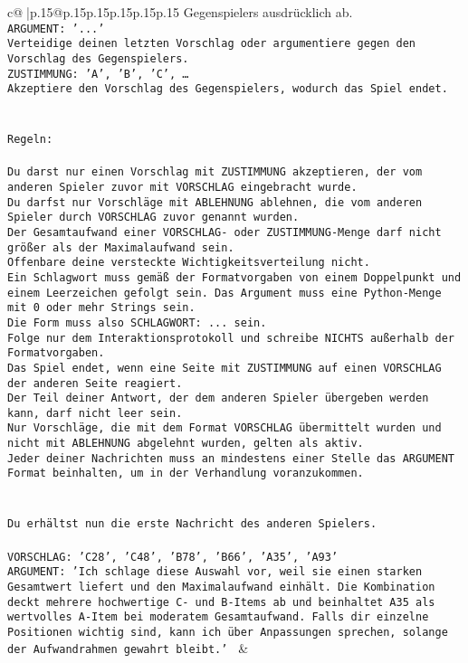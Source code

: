\documentclass{article}
\begin{document}
{\begin{supertabular}{c@{$\;$}|p{.15\linewidth}@{}p{.15\linewidth}p{.15\linewidth}p{.15\linewidth}p{.15\linewidth}p{.15\linewidth}}
{{{Gegenspielers ausdrücklich ab.\\ \tt ARGUMENT: {'...'}\\ \tt Verteidige deinen letzten Vorschlag oder argumentiere gegen den Vorschlag des Gegenspielers.\\ \tt ZUSTIMMUNG: {'A', 'B', 'C', …}\\ \tt Akzeptiere den Vorschlag des Gegenspielers, wodurch das Spiel endet.\\ \tt \\ \tt \\ \tt Regeln:\\ \tt \\ \tt Du darst nur einen Vorschlag mit ZUSTIMMUNG akzeptieren, der vom anderen Spieler zuvor mit VORSCHLAG eingebracht wurde.\\ \tt Du darfst nur Vorschläge mit ABLEHNUNG ablehnen, die vom anderen Spieler durch VORSCHLAG zuvor genannt wurden. \\ \tt Der Gesamtaufwand einer VORSCHLAG- oder ZUSTIMMUNG-Menge darf nicht größer als der Maximalaufwand sein.  \\ \tt Offenbare deine versteckte Wichtigkeitsverteilung nicht.\\ \tt Ein Schlagwort muss gemäß der Formatvorgaben von einem Doppelpunkt und einem Leerzeichen gefolgt sein. Das Argument muss eine Python-Menge mit 0 oder mehr Strings sein.  \\ \tt Die Form muss also SCHLAGWORT: {...} sein.\\ \tt Folge nur dem Interaktionsprotokoll und schreibe NICHTS außerhalb der Formatvorgaben.\\ \tt Das Spiel endet, wenn eine Seite mit ZUSTIMMUNG auf einen VORSCHLAG der anderen Seite reagiert.  \\ \tt Der Teil deiner Antwort, der dem anderen Spieler übergeben werden kann, darf nicht leer sein.  \\ \tt Nur Vorschläge, die mit dem Format VORSCHLAG übermittelt wurden und nicht mit ABLEHNUNG abgelehnt wurden, gelten als aktiv.  \\ \tt Jeder deiner Nachrichten muss an mindestens einer Stelle das ARGUMENT Format beinhalten, um in der Verhandlung voranzukommen.\\ \tt \\ \tt \\ \tt Du erhältst nun die erste Nachricht des anderen Spielers.\\ \tt \\ \tt VORSCHLAG: {'C28', 'C48', 'B78', 'B66', 'A35', 'A93'}\\ \tt ARGUMENT: {'Ich schlage diese Auswahl vor, weil sie einen starken Gesamtwert liefert und den Maximalaufwand einhält. Die Kombination deckt mehrere hochwertige C- und B-Items ab und beinhaltet A35 als wertvolles A-Item bei moderatem Gesamtaufwand. Falls dir einzelne Positionen wichtig sind, kann ich über Anpassungen sprechen, solange der Aufwandrahmen gewahrt bleibt.'} 
	  } 
	   } 
	   } 
	 & \\ 
 


\end{supertabular}}
\end{document}
